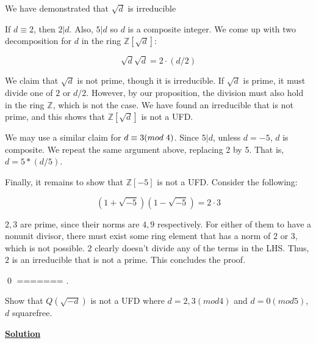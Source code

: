 \documentclass{article}
\newcommand{\new}[1]{
    \vspace{2mm}
    \noindent
    \textbf{
    \underline{#1}}
}
\def\ZZ{{\mathbb{Z}}}
\def\_{{\hspace{1mm}}}
\newcounter{problemcnt}
\newcommand{\Problem}{{
    \vspace{5mm}
    \stepcounter{problemcnt}
    \noindent
    \arabic{problemcnt}. 
}
}
\begin{document}
We have demonstrated that $\sqrt{d}$ is irreducible\checkmark


If $d \equiv 2$, then $2|d$. Also, $5|d$ so $d$ is a composite integer. 
We come up with two decomposition for $d$ in the ring $\ZZ[\sqrt{d}]$:

\[
    \sqrt{d}\sqrt{d} = 2\cdot(d/2)
\]

We claim that $\sqrt{d}$ is not prime, though it is irreducible. 
If $\sqrt{d}$ is prime, it must divide one of $2$ or $d/2$. However, 
by our proposition, the division must also hold in the ring $\ZZ$, which 
is not the case. We have found an irreducible that is not prime, 
and this shows that $\ZZ[\sqrt{d}]$ is not a UFD. 

We may use a similar claim for $d\equiv 3(mod\_4)$. Since $5|d$, 
unless $d = -5$, $d$ is composite. We repeat the same argument above, 
replacing 2 by 5. That is, $d = 5*(d/5)$. 

Finally, it remains to show that $\ZZ[-5]$ is not a UFD. Consider 
the following:

\[
    (1+\sqrt{-5})(1-\sqrt{-5}) = 2\cdot 3    
\]

$2, 3$ are prime, since their norms are $4, 9$ respectively. For either 
of them to have a nonunit divisor, there must exist some ring element that 
has a norm of $2$ or $3$, which is not possible. $2$ clearly doesn't 
divide any of the terms in the LHS. Thus, $2$ is an irreducible that 
is not a prime. This concludes the proof. 

\qed
=======
\Problem
Show that $Q(\sqrt{-d})$ is not a UFD
where $d = 2, 3(mod 4)$ and 
$d = 0(mod 5)$, $d$ squarefree. 

\new{Solution}

\begin{comment}
First, we establish that $\sqrt{-d}$
is an irreducible, regarless of the 
value of d. AFC, some ring element 
$\alpha = a + b\sqrt{-d}$ divides $\sqrt{d}$ 
where $\alpha \neq 0$ and $\alpha \neq \pm 
\sqrt{d}$. 

Write:

\[
    N(\alpha) | N(\sqrt{-d})
\]
\[
    (a^2-b^2d)|d
\]
So we infer $gcd(a^2-b^2d, d) = d$. 
$gcd(a^2-b^2d, d) = gcd(a^2, d) = d$,
so $d|a^2$. Since d is squarefree, 
by unique factorization in the integers, 
we get $d|a$. Write $a = d\bar(a)$. 

\end{comment}
\end{document}
